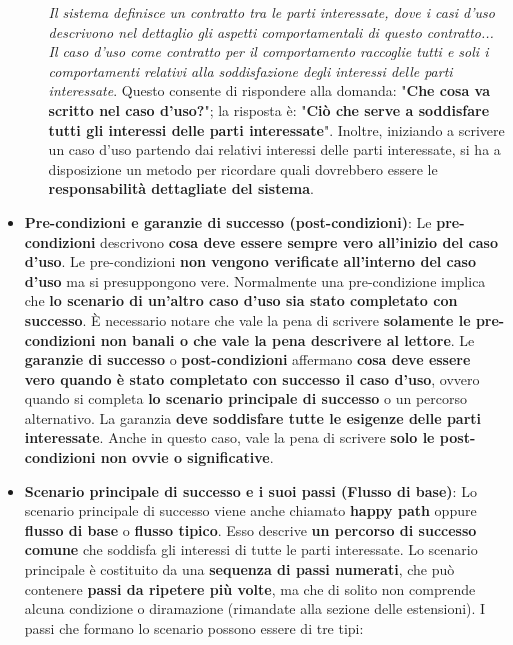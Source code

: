 \documentclass[12pt]{article}
\begin{document}
\begin{itemize}
\begin{itemize}
        \textit{Il sistema definisce un contratto tra le parti interessate, dove i casi d'uso descrivono nel dettaglio gli aspetti comportamentali di questo contratto... \newline Il caso d'uso come contratto per il comportamento raccoglie tutti e soli i comportamenti relativi alla soddisfazione degli interessi delle parti interessate}.
        Questo consente di rispondere alla domanda: "\textbf{Che cosa va scritto nel caso d'uso?}"; la risposta è: "\textbf{Ciò che serve a soddisfare tutti gli interessi delle parti interessate}".
        Inoltre, iniziando a scrivere un caso d'uso partendo dai relativi interessi delle parti interessate, si ha a disposizione un metodo per ricordare quali dovrebbero essere le \textbf{responsabilità dettagliate del sistema}.
    \end{itemize}
    \item \textbf{Pre-condizioni e garanzie di successo (post-condizioni)}: Le \textbf{pre-condizioni} descrivono \textbf{cosa deve essere sempre vero all'inizio del caso d'uso}.
    Le pre-condizioni \textbf{non vengono verificate all'interno del caso d'uso} ma si presuppongono vere. Normalmente una pre-condizione implica che \textbf{lo scenario di un'altro caso d'uso sia stato completato con successo}.
    È necessario notare che vale la pena di scrivere \textbf{solamente le pre-condizioni non banali o che vale la pena descrivere al lettore}.
    Le \textbf{garanzie di successo} o \textbf{post-condizioni} affermano \textbf{cosa deve essere vero quando è stato completato con successo il caso d'uso}, ovvero quando si completa \textbf{lo scenario principale di successo} o un percorso alternativo.
    La garanzia \textbf{deve soddisfare tutte le esigenze delle parti interessate}. Anche in questo caso, vale la pena di scrivere \textbf{solo le post-condizioni non ovvie o significative}.
    \item \textbf{Scenario principale di successo e i suoi passi (Flusso di base)}: Lo scenario principale di successo viene anche chiamato \textbf{happy path} oppure \textbf{flusso di base} o \textbf{flusso tipico}.
    Esso descrive \textbf{un percorso di successo comune} che soddisfa gli interessi di tutte le parti interessate. Lo scenario principale è costituito da una \textbf{sequenza di passi numerati}, che può contenere \textbf{passi da ripetere più volte}, ma che di solito non comprende alcuna condizione o diramazione (rimandate alla sezione delle estensioni).
    I passi che formano lo scenario possono essere di tre tipi:
    \begin{enumerate}

\end{enumerate}
\end{itemize}
\end{document}
